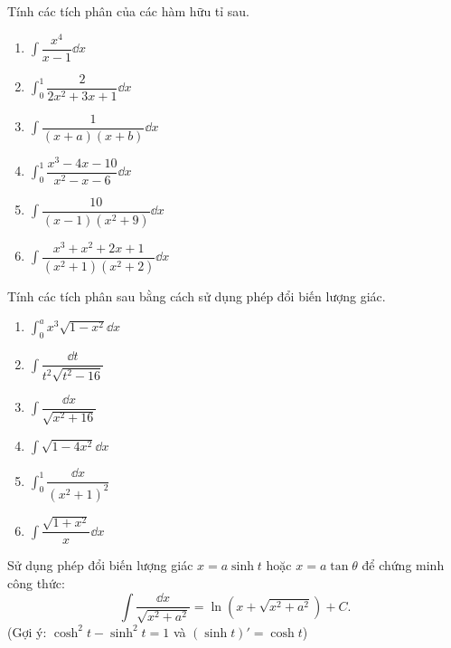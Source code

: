 \begin{exercise}
    Tính các tích phân của các hàm hữu tỉ sau.
    \begin{enumerate}[label=(\alph*)]
        \item $\int \dfrac{x^4}{x-1} \dd x$
        \item $\int_0^1 \dfrac{2}{2x^2+3x+1} \dd x$
        \item $\int \dfrac{1}{(x+a)(x+b)} \dd x$
        \item $\int_0^1 \dfrac{x^3-4x-10}{x^2-x-6} \dd x$
        \item $\int \dfrac{10}{(x-1)(x^2+9)} \dd x$
        \item $\int \dfrac{x^3+x^2+2x+1}{(x^2+1)(x^2+2)} \dd x$
    \end{enumerate}
\end{exercise}

\begin{exercise}
    Tính các tích phân sau bằng cách sử dụng phép đổi biến lượng giác.
    \begin{enumerate}[label=(\alph*)]
        \item $\int_0^a x^3\sqrt{1-x^2} \dd x$
        \item $\int \dfrac{\dd t}{t^2\sqrt{t^2-16}}$
        \item $\int \dfrac{\dd x}{\sqrt{x^2+16}}$
        \item $\int \sqrt{1-4x^2} \dd x$
        \item $\int_0^1 \dfrac{\dd x}{(x^2+1)^2}$
        \item $\int \dfrac{\sqrt{1+x^2}}{x} \dd x$
    \end{enumerate}
\end{exercise}

\begin{exercise}
    Sử dụng phép đổi biến lượng giác $x = a\sinh t$ hoặc $x=a\tan\theta$ để chứng minh công thức:
    \[ \int \dfrac{\dd x}{\sqrt{x^2+a^2}} = \ln(x + \sqrt{x^2+a^2}) + C. \]
    (Gợi ý: $\cosh^2 t - \sinh^2 t = 1$ và $(\sinh t)' = \cosh t$)
\end{exercise}

